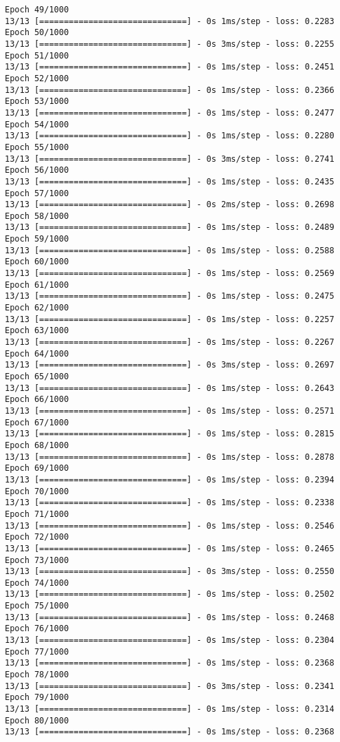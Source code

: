 \documentclass[11pt]{article}
\begin{document}
\begin{Verbatim}[commandchars=\\\{\}]
Epoch 49/1000
13/13 [==============================] - 0s 1ms/step - loss: 0.2283
Epoch 50/1000
13/13 [==============================] - 0s 3ms/step - loss: 0.2255
Epoch 51/1000
13/13 [==============================] - 0s 1ms/step - loss: 0.2451
Epoch 52/1000
13/13 [==============================] - 0s 1ms/step - loss: 0.2366
Epoch 53/1000
13/13 [==============================] - 0s 1ms/step - loss: 0.2477
Epoch 54/1000
13/13 [==============================] - 0s 1ms/step - loss: 0.2280
Epoch 55/1000
13/13 [==============================] - 0s 3ms/step - loss: 0.2741
Epoch 56/1000
13/13 [==============================] - 0s 1ms/step - loss: 0.2435
Epoch 57/1000
13/13 [==============================] - 0s 2ms/step - loss: 0.2698
Epoch 58/1000
13/13 [==============================] - 0s 1ms/step - loss: 0.2489
Epoch 59/1000
13/13 [==============================] - 0s 1ms/step - loss: 0.2588
Epoch 60/1000
13/13 [==============================] - 0s 1ms/step - loss: 0.2569
Epoch 61/1000
13/13 [==============================] - 0s 1ms/step - loss: 0.2475
Epoch 62/1000
13/13 [==============================] - 0s 1ms/step - loss: 0.2257
Epoch 63/1000
13/13 [==============================] - 0s 1ms/step - loss: 0.2267
Epoch 64/1000
13/13 [==============================] - 0s 3ms/step - loss: 0.2697
Epoch 65/1000
13/13 [==============================] - 0s 1ms/step - loss: 0.2643
Epoch 66/1000
13/13 [==============================] - 0s 1ms/step - loss: 0.2571
Epoch 67/1000
13/13 [==============================] - 0s 1ms/step - loss: 0.2815
Epoch 68/1000
13/13 [==============================] - 0s 1ms/step - loss: 0.2878
Epoch 69/1000
13/13 [==============================] - 0s 1ms/step - loss: 0.2394
Epoch 70/1000
13/13 [==============================] - 0s 1ms/step - loss: 0.2338
Epoch 71/1000
13/13 [==============================] - 0s 1ms/step - loss: 0.2546
Epoch 72/1000
13/13 [==============================] - 0s 1ms/step - loss: 0.2465
Epoch 73/1000
13/13 [==============================] - 0s 3ms/step - loss: 0.2550
Epoch 74/1000
13/13 [==============================] - 0s 1ms/step - loss: 0.2502
Epoch 75/1000
13/13 [==============================] - 0s 1ms/step - loss: 0.2468
Epoch 76/1000
13/13 [==============================] - 0s 1ms/step - loss: 0.2304
Epoch 77/1000
13/13 [==============================] - 0s 1ms/step - loss: 0.2368
Epoch 78/1000
13/13 [==============================] - 0s 3ms/step - loss: 0.2341
Epoch 79/1000
13/13 [==============================] - 0s 1ms/step - loss: 0.2314
Epoch 80/1000
13/13 [==============================] - 0s 1ms/step - loss: 0.2368

\end{Verbatim}
\end{document}
